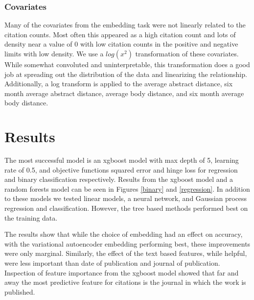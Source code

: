 \documentclass{article} %
\begin{document}
\subsubsection{Covariates}
Many of the covariates from the embedding task were not linearly related to the citation counts. Most often this appeared as a high citation count and lots of density near a value of 0 with low citation counts in the positive and negative limits with low density. We use a $log(x^2)$ transformation of these covariates. While somewhat convoluted and uninterpretable, this transformation does a good job at spreading out the distribution of the data and linearizing the relationship. Additionally, a log transform is applied to the average abstract distance, six month average abstract distance, average body distance, and six month average body distance.


\section{Results}

The most successful model is an xgboost model with max depth of 5, learning rate of 0.5, and objective functions squared error and hinge loss for regression and binary classification respectively. Results from the xgboost model and a random forests model can be seen in Figures \ref{binary} and \ref{regression}. In addition to these models we tested linear models, a neural network, and Gaussian process regression and classification. However, the tree based methods performed best on the training data.

The results show that while the choice of embedding had an effect on accuracy, with the variational autoencoder embedding performing best, these improvements were only marginal. Similarly, the effect of the text based features, while helpful,  were less important than date of publication and journal of publication. Inspection of feature importance from the xgboost model showed that far and away the most predictive feature for citations is the journal in which the work is published.
\end{document}
